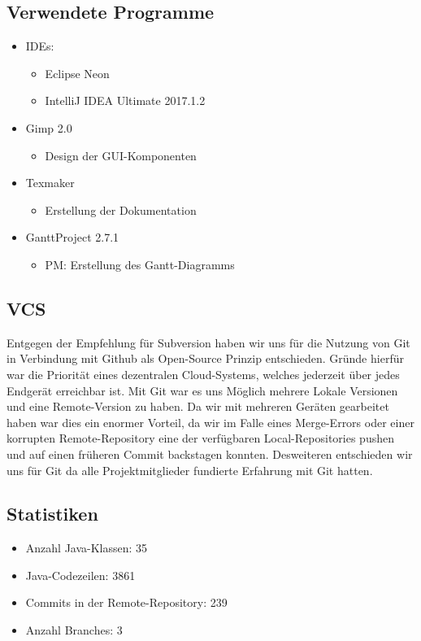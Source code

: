 \documentclass[12pt]{article}
\theoremstyle{plain}
\begin{document}
\subsection{Verwendete Programme}
\begin{itemize}
\item IDEs:
\begin{itemize}
\item Eclipse Neon
\item IntelliJ IDEA Ultimate 2017.1.2
\end{itemize}
\item Gimp 2.0
\begin{itemize}
\item Design der GUI-Komponenten
\end{itemize}
\item Texmaker
\begin{itemize}
\item Erstellung der Dokumentation
\end{itemize}
\item GanttProject 2.7.1
\begin{itemize}
\item PM: Erstellung des Gantt-Diagramms
\end{itemize}
\end{itemize}



\subsection{VCS}
Entgegen der Empfehlung für Subversion haben wir uns für die Nutzung von Git in Verbindung mit Github als Open-Source Prinzip entschieden. Gründe hierfür war die Priorität eines dezentralen Cloud-Systems, welches jederzeit über jedes Endgerät erreichbar ist. Mit Git war es uns Möglich mehrere Lokale Versionen und eine Remote-Version zu haben. Da wir mit mehreren Geräten gearbeitet haben war dies ein enormer Vorteil, da wir im Falle eines Merge-Errors oder einer korrupten Remote-Repository eine der verfügbaren Local-Repositories pushen und auf einen früheren Commit backstagen konnten. Desweiteren entschieden wir uns für Git da alle Projektmitglieder fundierte Erfahrung mit Git hatten.	
\subsection{Statistiken}
\begin{itemize}
\item Anzahl Java-Klassen: 35
\item Java-Codezeilen: 3861
\item Commits in der Remote-Repository: 239
\item Anzahl Branches: 3
\end{itemize}
\end{document}
